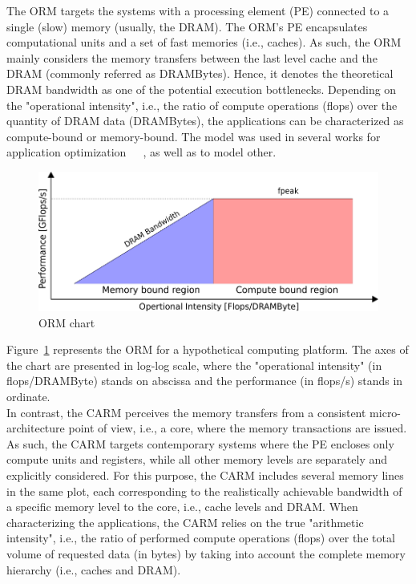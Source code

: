 \documentclass[twoside,twocolumn,9pt]{extarticle}
\begin{document}
The ORM targets the systems with a processing element (PE) connected to a single (slow) memory (usually, the DRAM). The ORM's
PE encapsulates computational units and a set of fast memories (i.e., caches). As such, the ORM mainly considers the memory
transfers between the last level cache and the DRAM (commonly referred as DRAMBytes). Hence, it denotes the theoretical DRAM
bandwidth as one of the potential execution bottlenecks. Depending on the "operational intensity", i.e., the ratio of compute
operations (flops) over the quantity of DRAM data (DRAMBytes), the applications can be characterized as compute-bound or
memory-bound. The model was used in several works for application
optimization~\cite{Kim20111201}~\cite{Rossinelli2164}~\cite{vanNieuwpoort:2009:UMH:1542275.1542337}, as well as to model other.

\begin{figure}
  \centering
  \includegraphics[width=.48\textwidth]{pictures/roofline_chart.png}
  \caption{ORM chart}
  \label{fig:roofline_chart}
\end{figure}

Figure~\ref{fig:roofline_chart} represents the ORM for a hypothetical computing platform. The axes of the chart are presented in
log-log scale, where the "operational intensity" (in flops/DRAMByte) stands on abscissa and the performance (in flops/s) stands
in ordinate.\\

In contrast, the CARM perceives the memory transfers from a consistent micro-architecture point of view, i.e., a core, where
the memory transactions are issued. As such, the CARM targets contemporary systems where the PE encloses only compute units
and registers, while all other memory levels are separately and explicitly considered. For this purpose, the CARM includes several
memory lines in the same plot, each corresponding to the realistically achievable bandwidth of a specific memory level to the core,
i.e., cache levels and DRAM. When characterizing the applications, the CARM relies on the true "arithmetic intensity", i.e., the
ratio of performed compute operations (flops) over the total volume of requested data (in bytes) by taking into account the
complete memory hierarchy (i.e., caches and DRAM).\\
\end{document}
